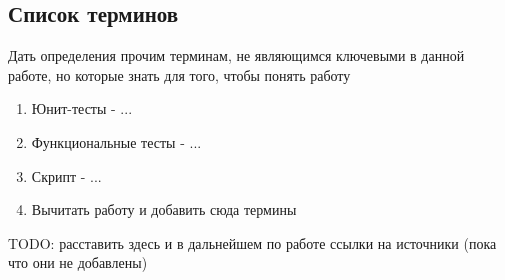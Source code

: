 \subsection{Список терминов}
Дать определения прочим терминам, не являющимся ключевыми в данной работе, но которые знать для того, чтобы понять работу
\begin{enumerate}
    \item Юнит-тесты - ...
    \item Функциональные тесты - ...
    \item Скрипт - ...
    \item Вычитать работу и добавить сюда термины
\end{enumerate}

TODO: расставить здесь и в дальнейшем по работе ссылки на источники (пока что они не добавлены)

\pagebreak
